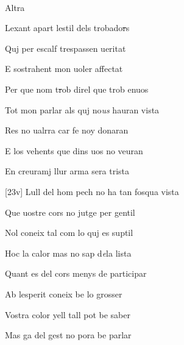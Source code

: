\documentclass[12pt]{article}
\renewcommand{\espaiAbansEtiquetaPoema}{\vspace{0ex}}
\begin{document}
\begin{estrofa}

\espaiAbansEtiquetaPoema

\\

\begin{rubrica}

Altra

\end{rubrica}

\end{estrofa}


\begin{estrofa}

 Lexant apart lestil dels trobado\sout{r}s

 Quj per escalf trespassen ueritat

 E sostrahent mon uoler affectat

 Per que nom t\sout{r}ob direl que trob enuos

 Tot mon parlar als quj no\textit{us} hauran vista

 Res no ualrra car fe noy donaran

 E los vehents que dins uos no veuran

 En creuramj llur arma sera trista

\end{estrofa}



\begin{estrofa}

 [23v] Lull del hom pech no ha tan fosqua vista

 Que uostre cors no jutge per gentil

 Nol coneix tal com lo quj es suptil

 Hoc la calor mas no sap d\textit{e}la lista

 Quant es del cors menys de participar

 Ab lesperit coneix be lo grosser

 Vostra color yell tall pot be saber

 Mas ga del gest no pora be parlar

\end{estrofa}
\end{document}
